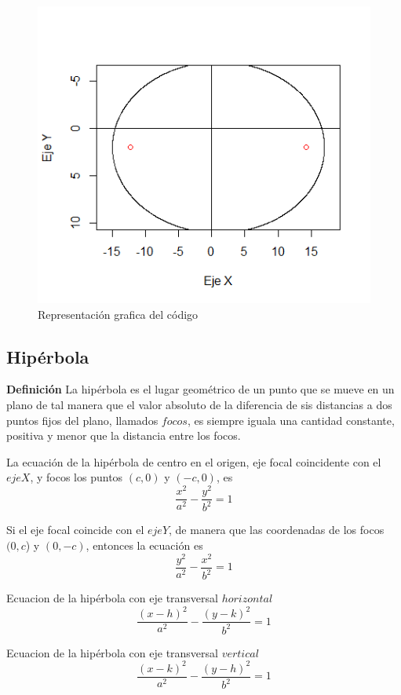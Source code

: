 \documentclass[12pt,a4paper]{article} %
\begin{document}
\begin{figure}
\centering
\includegraphics[scale=0.7]{Elipse2}
\caption{Representación grafica del código}
\label{fig:Elipse2}
\end{figure}



\newpage

\subsection{Hipérbola}
\citep{geometria}\textbf{Definición} La hipérbola es el lugar geométrico de un punto que se mueve en un plano de tal manera que el valor absoluto de la diferencia de sis distancias a dos puntos fijos del plano, llamados $focos$, es siempre iguala una cantidad constante, positiva y menor que la distancia entre los focos.

La ecuación de la hipérbola de centro en el origen, eje focal coincidente con el $eje X$, y focos los puntos $(c,0)$ y $(-c,0)$, es
$$ {\frac{x^2}{a^2} - \frac{y^2}{b^2} = 1} $$

Si el eje focal coincide con el $eje Y$, de manera que las coordenadas de los focos $(0,c$) y $(0,-c)$, entonces la ecuación es 
$$ {\frac{y^2}{a^2} - \frac{x^2}{b^2} = 1} $$

Ecuacion de la hipérbola con eje transversal $horizontal$
$$ {\frac{(x - h)^2}{a^2} - \frac{(y - k)^2}{b^2} = 1} $$

Ecuacion de la hipérbola con eje transversal $vertical$
$$ {\frac{(x - k)^2}{a^2} - \frac{(y - h)^2}{b^2} = 1} $$
\end{document}
